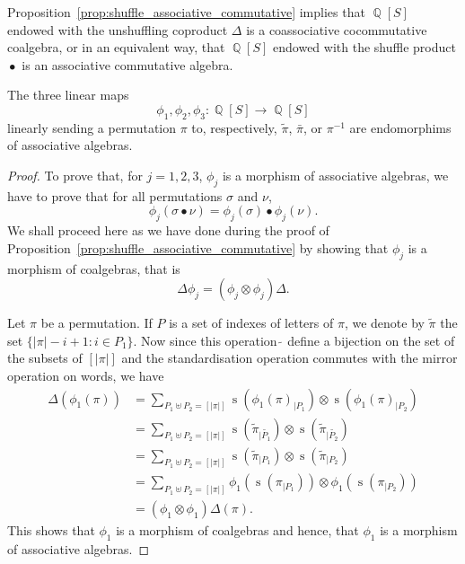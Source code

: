 \documentclass[a4paper,10pt]{llncs}
\DeclareMathOperator{\QQ}{\mathbb{Q}}
\DeclareMathOperator{\STD}{\mathrm{s}}
\DeclareMathOperator{\SHUFFLE}{\bullet}
\begin{document}
Proposition~\ref{prop:shuffle_associative_commutative} implies that
$\QQ[S]$ endowed with the unshuffling coproduct $\Delta$ is a
coassociative cocommutative coalgebra, or in an equivalent way, that
$\QQ[S]$ endowed with the shuffle product $\SHUFFLE$ is an associative
commutative algebra.
\medskip

\begin{proposition} \label{prop:endomorphisms}
    The three linear maps
    \begin{equation}
        \phi_1, \phi_2, \phi_3 : \QQ[S] \to \QQ[S]
    \end{equation}
    linearly sending a permutation $\pi$ to, respectively,
    $\widetilde{\pi}$, $\bar \pi$, or $\pi^{-1}$ are endomorphims of
    associative algebras.
\end{proposition}
\begin{proof}
    To prove that, for $j = 1, 2, 3$, $\phi_j$ is a morphism of
    associative algebras, we have to prove that for all permutations
    $\sigma$ and $\nu$,
    \begin{equation}
        \phi_j(\sigma \SHUFFLE \nu) =
        \phi_j(\sigma) \SHUFFLE \phi_j(\nu).
    \end{equation}
    We shall proceed here as we have done during the proof of
    Proposition~\ref{prop:shuffle_associative_commutative} by showing
    that $\phi_j$ is a morphism of coalgebras, that is
    \begin{equation}
        \Delta \phi_j = (\phi_j \otimes \phi_j) \Delta.
    \end{equation}
    \smallskip

    Let $\pi$ be a permutation. If $P$ is a set of indexes of letters of
    $\pi$, we denote by $\widetilde{\pi}$ the set
    $\{|\pi| - i  + 1 : i \in P_1\}$. Now since this operation
    $\widetilde{\,}$ define a bijection on the set of the subsets of
    $[|\pi|]$ and the standardisation operation commutes with the
    mirror operation on words, we have
    \begin{equation} \begin{split}
        \Delta(\phi_1(\pi))
        & = \sum_{P_1 \uplus P_2 = [|\pi|]} \STD\left(\phi_1(\pi)_{|P_1}\right)
        \otimes \STD\left(\phi_1(\pi)_{|P_2}\right) \\
        & = \sum_{P_1 \uplus P_2 =
        [|\pi|]} \STD\left(\widetilde{\pi}_{|\widetilde{P_1}}\right)
        \otimes \STD\left(\widetilde{\pi}_{|\widetilde{P_2}}\right) \\
        & = \sum_{P_1 \uplus P_2 =
        [|\pi|]} \STD\left(\widetilde{\pi}_{|P_1}\right)
        \otimes \STD\left(\widetilde{\pi}_{|P_2}\right) \\
        & = \sum_{P_1 \uplus P_2 =
        [|\pi|]} \phi_1\left(\STD\left(\pi_{|P_1}\right)\right)
        \otimes \phi_1\left(\STD\left(\pi_{|P_2}\right)\right) \\
        & = (\phi_1 \otimes \phi_1) \Delta(\pi).
    \end{split} \end{equation}
    This shows that $\phi_1$ is a morphism of coalgebras and hence, that
    $\phi_1$ is a morphism of associative algebras.
    \smallskip


\end{proof}
\end{document}
